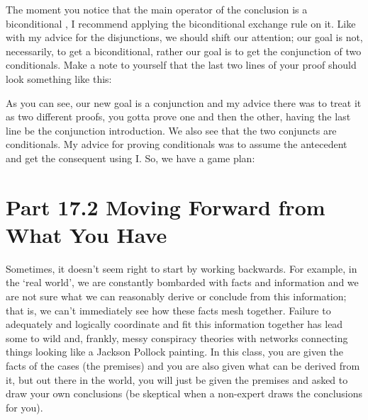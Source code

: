 The moment you notice that the main operator of the conclusion is a biconditional \eiff{}, I recommend applying the biconditional exchange rule on it. Like with my advice for the disjunctions, we should shift our attention; our goal is not, necessarily, to get a biconditional, rather our goal is to get the conjunction of two conditionals. Make a note to yourself that the last two lines of your proof should look something like this:

\begin{fitchproof}
 {}
\end{fitchproof}

As you can see, our new goal is a conjunction and my advice there was to treat it as two different proofs, you gotta prove one and then the other, having the last line be the conjunction introduction. We also see that the two conjuncts are conditionals. My advice for proving conditionals was to assume the antecedent and get the consequent using \eif I. So, we have a game plan:
\begin{fitchproof}
\ellipsesline			
{}			
\open
{}			
\ellipsesline		
{}			
\close
{}	
\open
{}			
\ellipsesline		
{}			
\close
{}	
 
\end{fitchproof}

\section{Part 17.2 Moving Forward from What You Have}

Sometimes, it doesn't seem right to start by working backwards. For example, in the `real world', we are constantly bombarded with facts and information and we are not sure what we can reasonably derive or conclude from this information; that is, we can't immediately see how these facts mesh together. Failure to adequately and logically coordinate and fit this information together has lead some to wild and, frankly, messy conspiracy theories with networks connecting things looking like a Jackson Pollock painting. In this class, you are given the facts of the cases (the premises) and you are also given what can be derived from it, but out there in the world, you will just be given the premises and asked to draw your own conclusions (be skeptical when a non-expert draws the conclusions for you).

